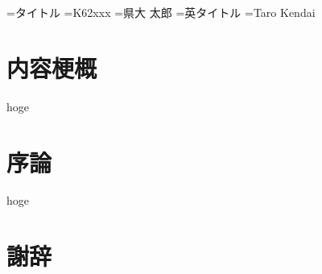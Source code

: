 \documentclass[a4paper,11pt,nomag]{jsreport} %
\begin{document}
{}={タイトル}
={K62xxx}           %
={県大 太郎}             %
={英タイトル} %
={Taro Kendai}
\MakeTitle
\newpage
\begin{abstract}\hspace{0.5zw}

\end{abstract}

\chapter*{内容梗概}
\thispagestyle{empty}

hoge

\chapter{序論}
\setcounter{page}{1}

hoge

\chapter*{謝辞}




\tocack
\tocbib
\begin{thebibliography}{99}

\end{thebibliography}
\end{document}
